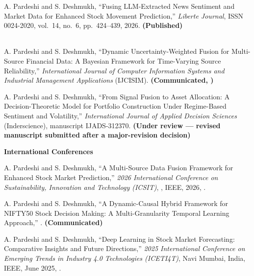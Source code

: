 \begin{enumerate}[label={[P\arabic*]},leftmargin=2.6em,start=3]
\item A. Pardeshi and S. Deshmukh, ``Fusing LLM-Extracted News Sentiment and Market Data
for Enhanced Stock Movement Prediction,'' \emph{Liberte Journal}, ISSN 0024-2020,
vol.~14, no.~6, pp.~424--439, 2026. \textbf{(Published)}\\
\indexing{\LiberteIndexing} \\ \link{\LiberteURL}

\item A. Pardeshi and S. Deshmukh, ``Dynamic Uncertainty-Weighted Fusion for Multi-Source
Financial Data: A Bayesian Framework for Time-Varying Source Reliability,''
\emph{International Journal of Computer Information Systems and Industrial Management
Applications} (IJCISIM). \textbf{(Communicated, \IJCISIMDate)}\\
\link{\IJCISIMURL}

\item A. Pardeshi and S. Deshmukh, ``From Signal Fusion to Asset Allocation: A
Decision-Theoretic Model for Portfolio Construction Under Regime-Based Sentiment and
Volatility,'' \emph{International Journal of Applied Decision Sciences} (Inderscience),
manuscript IJADS-312370. \textbf{(Under review --- revised manuscript submitted after a
major-revision decision)}\\
\link{\IJADSURL}
\end{enumerate}

\textbf{International Conferences}

\begin{enumerate}[label={[P\arabic*]},leftmargin=2.6em]
\item A. Pardeshi and S. Deshmukh, ``A Multi-Source Data Fusion Framework for Enhanced
Stock Market Prediction,'' \emph{2026 International Conference on Sustainability,
Innovation and Technology (ICSIT)}, \ICSITVenue, IEEE, 2026, \ICSITPages.\\
\link{\ICSITURL}

\item A. Pardeshi and S. Deshmukh, ``A Dynamic-Causal Hybrid Framework for NIFTY50 Stock
Decision Making: A Multi-Granularity Temporal Learning Approach,'' \DCHFVenue.
\textbf{(Communicated)}\\
\link{\DCHFURL}
\setcounter{enumi}{5}
\item A. Pardeshi and S. Deshmukh, ``Deep Learning in Stock Market Forecasting:
Comparative Insights and Future Directions,'' \emph{2025 International Conference on
Emerging Trends in Industry 4.0 Technologies (ICETI4T)}, Navi Mumbai, India, IEEE,
June 2025, \ICETIPages.\\
\link{\ICETIURL}
\end{enumerate}

